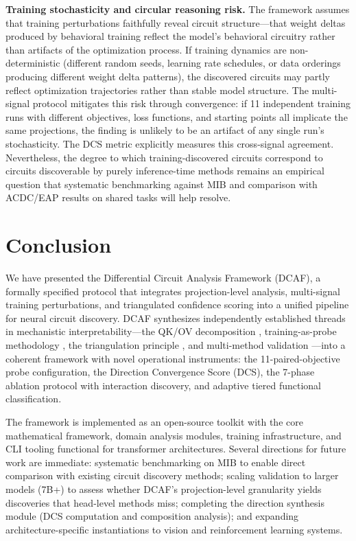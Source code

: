 \documentclass[11pt]{article}
\begin{document}
\textbf{Training stochasticity and circular reasoning risk.} The framework assumes that training perturbations faithfully reveal circuit structure---that weight deltas produced by behavioral training reflect the model's behavioral circuitry rather than artifacts of the optimization process. If training dynamics are non-deterministic (different random seeds, learning rate schedules, or data orderings producing different weight delta patterns), the discovered circuits may partly reflect optimization trajectories rather than stable model structure. The multi-signal protocol mitigates this risk through convergence: if 11 independent training runs with different objectives, loss functions, and starting points all implicate the same projections, the finding is unlikely to be an artifact of any single run's stochasticity. The DCS metric explicitly measures this cross-signal agreement. Nevertheless, the degree to which training-discovered circuits correspond to circuits discoverable by purely inference-time methods remains an empirical question that systematic benchmarking against MIB and comparison with ACDC/EAP results on shared tasks will help resolve.

\section{Conclusion}
\label{sec:conclusion}

We have presented the Differential Circuit Analysis Framework (DCAF), a formally specified protocol that integrates projection-level analysis, multi-signal training perturbations, and triangulated confidence scoring into a unified pipeline for neural circuit discovery. DCAF synthesizes independently established threads in mechanistic interpretability---the QK/OV decomposition \citep{elhage2021mathematical}, training-as-probe methodology \citep{prakash2024finetuning,tigges2024consistent}, the triangulation principle \citep{long2025triangulation,sharkey2025openproblems}, and multi-method validation \citep{mondorf2025ensemble}---into a coherent framework with novel operational instruments: the 11-paired-objective probe configuration, the Direction Convergence Score (DCS), the 7-phase ablation protocol with interaction discovery, and adaptive tiered functional classification.

The framework is implemented as an open-source toolkit with the core mathematical framework, domain analysis modules, training infrastructure, and CLI tooling functional for transformer architectures. Several directions for future work are immediate: systematic benchmarking on MIB \citep{mueller2025mib} to enable direct comparison with existing circuit discovery methods; scaling validation to larger models (7B+) to assess whether DCAF's projection-level granularity yields discoveries that head-level methods miss; completing the direction synthesis module (DCS computation and composition analysis); and expanding architecture-specific instantiations to vision and reinforcement learning systems.
\end{document}
